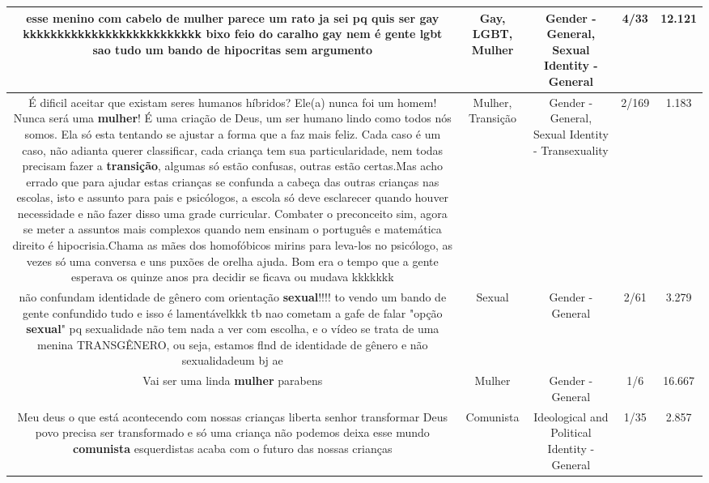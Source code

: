 \documentclass[11pt]{article}
\newlength\mylength
\begin{document}
\begin{center}
\begin{longtable}{|C{.65\mylength}|C{.30\mylength}|C{.12\mylength}|C{.12\mylength}|C{.12\mylength}|}
  \small esse menino com cabelo  de \textbf{mulher} parece um rato ja sei pq quis ser \textbf{gay} kkkkkkkkkkkkkkkkkkkkkkkkkk bixo feio do caralho \textbf{gay} nem é gente \textbf{lgbt} sao tudo um bando de hipocritas sem argumento\normalsize   & Gay, LGBT, Mulher & Gender - General, Sexual Identity - General & 4/33 & 12.121 \\  \hline
  \small É dificil aceitar que existam seres humanos híbridos? Ele(a) nunca foi um homem! Nunca será uma \textbf{mulher}! É uma criação de Deus, um ser humano lindo como todos nós somos. Ela só esta tentando se ajustar a forma que a faz mais feliz. Cada caso é um caso, não adianta querer classificar, cada criança tem sua particularidade, nem todas precisam fazer a \textbf{transição}, algumas só estão confusas, outras estão certas.Mas acho errado que para ajudar estas crianças se confunda a cabeça das outras crianças nas escolas, isto e assunto para pais e psicólogos, a escola só deve esclarecer quando houver necessidade e não fazer disso uma grade curricular. Combater o preconceito sim, agora se meter a assuntos mais complexos quando nem ensinam o português e matemática direito é hipocrisia.Chama as mães dos homofóbicos mirins para leva-los no psicólogo, as vezes só uma conversa e uns puxões de orelha ajuda. Bom era o tempo que a gente esperava os quinze anos pra decidir se ficava ou mudava kkkkkkk\normalsize   & Mulher, Transição & Gender - General, Sexual Identity - Transexuality & 2/169 & 1.183 \\  \hline
  \small não confundam identidade de gênero com orientação \textbf{sexual}!!!! to vendo um bando de gente confundido tudo e isso é lamentávelkkk tb nao cometam a gafe de falar "opção \textbf{sexual}" pq sexualidade não tem nada a ver com escolha,  e o vídeo se trata de uma menina TRANSGÊNERO, ou seja, estamos flnd de identidade de gênero e não sexualidadeum bj ae\normalsize   & Sexual & Gender - General & 2/61 & 3.279 \\  \hline
  \small Vai ser uma linda \textbf{mulher} parabens\normalsize   & Mulher & Gender - General & 1/6 & 16.667 \\  \hline
  \small Meu deus o que está acontecendo com nossas crianças  liberta senhor  transformar Deus povo precisa  ser transformado   e só uma criança  não podemos deixa esse mundo \textbf{comunista} esquerdistas  acaba com o futuro das nossas crianças\normalsize   & Comunista & Ideological and Political Identity - General & 1/35 & 2.857 \\  \hline

\end{longtable}
\end{center}
\end{document}
